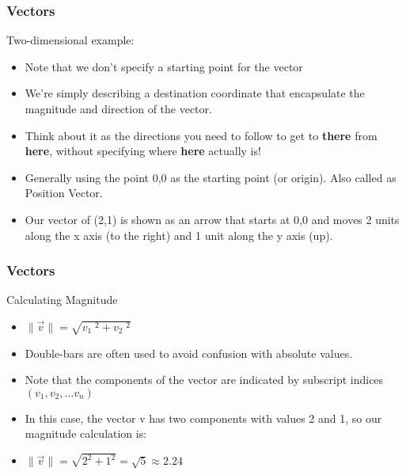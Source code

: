  \begin{frame}[fragile] \frametitle{Vectors}
Two-dimensional example:
\begin{itemize}

\item Note that we don't specify a starting point for the vector
\item We're simply describing a destination coordinate that encapsulate the magnitude and direction of the vector. 
\item Think about it as the directions you need to follow to get to {\bf there} from {\bf here}, without specifying where {\bf here} actually is!
\item Generally using the point 0,0 as the starting point (or origin). Also called as Position Vector.
\item Our vector of (2,1) is shown as an arrow that starts at 0,0 and moves 2 units along the x axis (to the right) and 1 unit along the y axis (up).
\end{itemize}

\end{frame}

 \begin{frame}[fragile] \frametitle{Vectors}
Calculating Magnitude
\begin{itemize}

\item $\|\vec{v}\| = \sqrt{v_{1}\;^{2} + v_{2}\;^{2}}$
\item Double-bars are often used to avoid confusion with absolute values. 
\item Note that the components of the vector are indicated by subscript indices $(v_1, v_2,\ldots v_n)$
\item In this case, the vector v has two components with values 2 and 1, so our magnitude calculation is:
\item $\|\vec{v}\| = \sqrt{2^{2} + 1^{2}} = \sqrt{5} \approx 2.24$
\end{itemize}

\end{frame}


